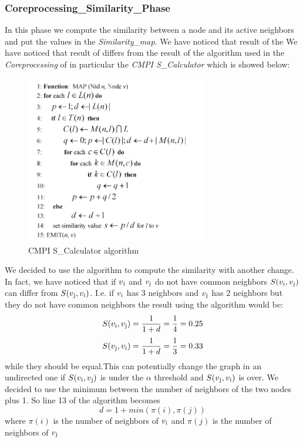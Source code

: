 \documentclass[12pt]{article}
\begin{document}
\subsubsection{Coreprocessing\_Similarity\_Phase}
In this phase we compute the similarity between a node and its active neighbors and put the values in the \emph{Similarity\_map}. We have noticed that result of the We have noticed that result of  differs from the result of the algorithm used in the \emph{Coreprocessing} of \cite{6517336} in particular the \emph{CMPI S\_Calculator} which is showed below:
     \begin{figure}[H]
       \centering
         \includegraphics[width=0.7\textwidth]{similarity-code.png}
       \caption{CMPI S\_Calculator algorithm}
       \label{fig:depold}
     \end{figure}
We decided to use the algorithm to compute the similarity with another change. In fact, we have noticed that
if $v\textsubscript{i}$ and $v\textsubscript{j}$ do not have common neighbors $S(v\textsubscript{i},v\textsubscript{j})$ can differ from  $S(v\textsubscript{j},v\textsubscript{i})$. I.e. if $v\textsubscript{i}$ has 3 neighbors and $v\textsubscript{j}$ has 2 neighbors but they do not have common neighbors the result using the algorithm would be:
\begin{equation}
  S(v\textsubscript{i},v\textsubscript{j}) = \frac{1}{1 + d} = \frac{1}{4} = 0.25
\end{equation}
\begin{equation}
  S(v\textsubscript{j},v\textsubscript{i}) = \frac{1}{1 + d} = \frac{1}{3} = 0.33
\end{equation}
while they should be equal.This can potentially change the graph in an undirected one if   $S(v\textsubscript{i},v\textsubscript{j})$ is under the $\alpha$ threshold and $S(v\textsubscript{j},v\textsubscript{i})$ is over.
We decided to use the minimum between the number of neighbors of the two nodes plus 1. So line 13 of the algorithm becomes
\begin{equation}
    d = 1 + min(\pi(i), \pi(j))
\end{equation}
where $\pi(i)$ is the number of neighbors of $v\textsubscript{i}$ and $\pi(j)$ is the number of neighbors of $v\textsubscript{j}$
\end{document}
